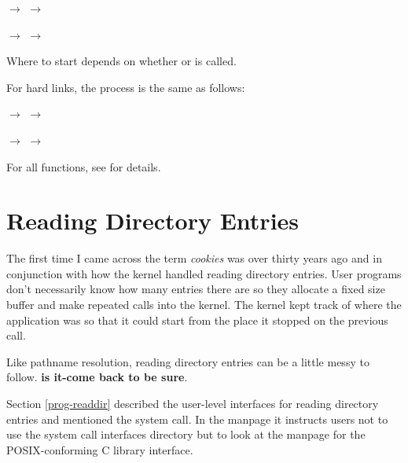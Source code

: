\small
\bigskip 
{} $\rightarrow$   $\rightarrow$  

\vspace{1pt}
\hspace{1.50in}$\rightarrow$  $\rightarrow$ 
    
\bigskip
\normalsize
\noindent
Where to start depends on whether  or  is called. 

For hard links, the process is the same as follows:

\small
\bigskip 
{} $\rightarrow$   $\rightarrow$  

\vspace{1pt}
\hspace{1.65in}$\rightarrow$  $\rightarrow$ 
    
\bigskip
\normalsize
\noindent
For all functions, see  for details.


\section{Reading Directory Entries}\label{vfs_readdir}

The first time I came across the term \textit{cookies} was over thirty years ago and in conjunction with how the kernel handled reading directory entries. User programs don't necessarily know how many entries there are so they allocate a fixed size buffer and make repeated calls into the kernel. The kernel kept track of where the application was so that it could start from the place it stopped on the previous call.

Like pathname resolution, reading directory entries can be a little messy to follow. \textbf{is it-come back to be sure}.

Section \ref{prog-readdir} described the user-level interfaces for reading directory entries and mentioned the  system call. In the manpage it instructs users not to use the system call interfaces directory but to look at the  manpage for the POSIX-conforming C library interface.

